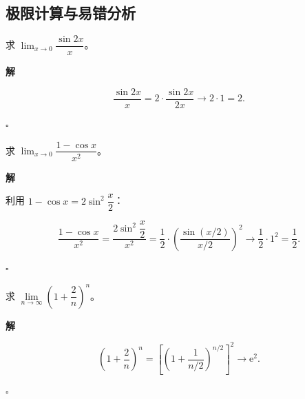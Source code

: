\documentclass[fontset=fandol]{ctexart}
\newenvironment{solution}{\par\noindent\textbf{解}\quad}{\hfill$\square$\par\vspace{0.8em}}
\newcommand{\ee}{\mathrm{e}}
\begin{document}
\subsection{极限计算与易错分析}



\begin{example}

求 \(\lim_{x \to 0} \dfrac{\sin 2x}{x}\)。

\end{example}



\begin{solution}

\[

\dfrac{\sin 2x}{x} = 2 \cdot \dfrac{\sin 2x}{2x} \to 2 \cdot 1 = 2.

\]

\end{solution}



\begin{example}

求 \(\lim_{x \to 0} \dfrac{1 - \cos x}{x^2}\)。

\end{example}



\begin{solution}

利用 \(1 - \cos x = 2 \sin^2 \dfrac{x}{2}\)：

\[

\dfrac{1 - \cos x}{x^2} = \dfrac{2 \sin^2 \dfrac{x}{2}}{x^2} = \dfrac{1}{2} \cdot \left( \dfrac{\sin (x/2)}{x/2} \right)^2 \to \dfrac{1}{2} \cdot 1^2 = \dfrac{1}{2}.

\]

\end{solution}



\begin{example}

求 \(\lim\limits_{n\to\infty} \left(1 + \dfrac{2}{n}\right)^n\)。

\end{example}

\begin{solution}

\[

\left(1 + \dfrac{2}{n}\right)^n = \left[\left(1 + \dfrac{1}{n/2}\right)^{n/2}\right]^2 \to \ee^2.

\]

\end{solution}
\end{document}
